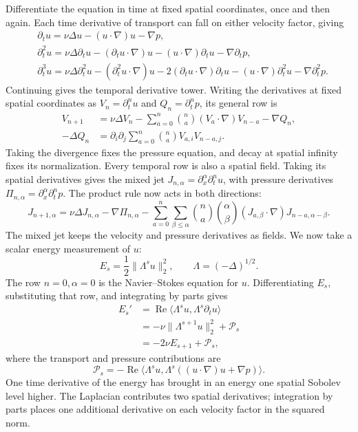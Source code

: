 Differentiate the equation in time at fixed spatial coordinates, once
and then again. Each time derivative of transport can fall on either
velocity factor, giving
\[
 \begin{aligned}
 &\partial_tu=\nu\Delta u-(u\cdot\nabla)u-\nabla p,\\
 &\partial_t^2u=\nu\Delta\partial_tu-(\partial_tu\cdot\nabla)u
   -(u\cdot\nabla)\partial_tu-\nabla\partial_tp,\\
 &\partial_t^3u=\nu\Delta\partial_t^2u-(\partial_t^2u\cdot\nabla)u
   -2(\partial_tu\cdot\nabla)\partial_tu
   -(u\cdot\nabla)\partial_t^2u-\nabla\partial_t^2p.
 \end{aligned}
\]
Continuing gives the temporal derivative tower. Writing the derivatives at
fixed spatial coordinates as \(V_n=\partial_t^nu\) and
\(Q_n=\partial_t^np\), its general row is
\[
 \begin{aligned}
 V_{n+1}&=\nu\Delta V_n
 -\sum_{a=0}^{n}\binom na(V_a\cdot\nabla)V_{n-a}-\nabla Q_n,\\
 -\Delta Q_n&=\partial_i\partial_j
   \sum_{a=0}^{n}\binom na V_{a,i}V_{n-a,j}.
 \end{aligned}
\]
Taking the divergence fixes the pressure equation, and decay at spatial
infinity fixes its normalization. Every temporal row is also a spatial
field. Taking its spatial derivatives gives the mixed jet
\(J_{n,\alpha}=\partial_x^\alpha\partial_t^nu\), with pressure derivatives
\(\Pi_{n,\alpha}=\partial_x^\alpha\partial_t^np\). The product rule now
acts in both directions:
\[
 J_{n+1,\alpha}=\nu\Delta J_{n,\alpha}-\nabla\Pi_{n,\alpha}
 -\sum_{a=0}^{n}\sum_{\beta\le\alpha}
   \binom na\binom\alpha\beta
   (J_{a,\beta}\cdot\nabla)J_{n-a,\alpha-\beta}.
\]
The mixed jet keeps the velocity and pressure derivatives as fields.
We now take a scalar energy measurement of \(u\):
\[
 E_s=\frac12\|\Lambda^su\|_2^2,
 \qquad \Lambda=(-\Delta)^{1/2}.
\]
The row \(n=0,\alpha=0\) is the Navier--Stokes equation for \(u\).
Differentiating \(E_s\), substituting that row, and integrating by parts gives
\[
 \begin{aligned}
 E_s'
 &=\operatorname{Re}\langle\Lambda^su,\Lambda^s\partial_tu\rangle\\
 &=-\nu\|\Lambda^{s+1}u\|_2^2+\mathcal P_s\\
 &=-2\nu E_{s+1}+\mathcal P_s,
 \end{aligned}
\]
where the transport and pressure contributions are
\[
 \mathcal P_s=-\operatorname{Re}\langle\Lambda^su,
 \Lambda^s((u\cdot\nabla)u+\nabla p)\rangle.
\]
One time derivative of the energy has brought in an energy one spatial
Sobolev level higher. The Laplacian contributes two spatial derivatives;
integration by parts places one additional derivative on each velocity
factor in the squared norm.

